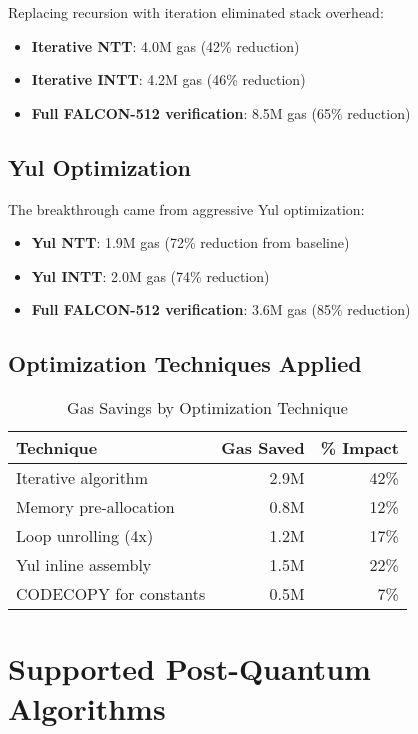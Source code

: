 \documentclass[11pt,a4paper]{article}
\begin{document}
Replacing recursion with iteration eliminated stack overhead:

\begin{itemize}
\item \textbf{Iterative NTT}: 4.0M gas (42\% reduction)
\item \textbf{Iterative INTT}: 4.2M gas (46\% reduction)
\item \textbf{Full FALCON-512 verification}: 8.5M gas (65\% reduction)
\end{itemize}

\subsection{Yul Optimization}

The breakthrough came from aggressive Yul optimization:

\begin{itemize}
\item \textbf{Yul NTT}: 1.9M gas (72\% reduction from baseline)
\item \textbf{Yul INTT}: 2.0M gas (74\% reduction)
\item \textbf{Full FALCON-512 verification}: 3.6M gas (85\% reduction)
\end{itemize}

\subsection{Optimization Techniques Applied}

\begin{table}[h]
\centering
\caption{Gas Savings by Optimization Technique}
\begin{tabular}{lrr}
\toprule
Technique & Gas Saved & \% Impact \\
\midrule
Iterative algorithm & 2.9M & 42\% \\
Memory pre-allocation & 0.8M & 12\% \\
Loop unrolling (4x) & 1.2M & 17\% \\
Yul inline assembly & 1.5M & 22\% \\
CODECOPY for constants & 0.5M & 7\% \\
\bottomrule
\end{tabular}
\end{table}

\section{Supported Post-Quantum Algorithms}
\end{document}
